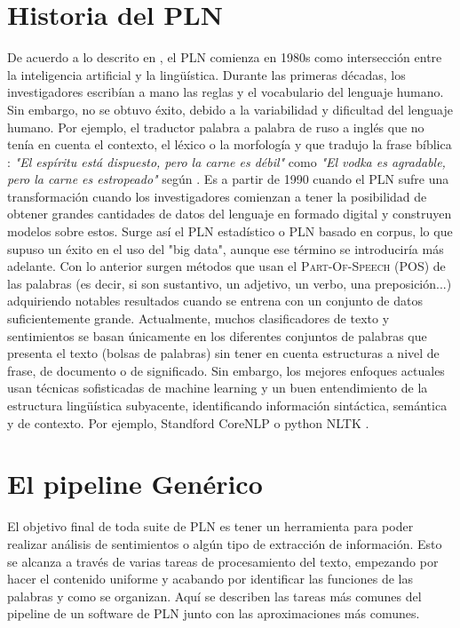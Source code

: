 \section{Historia del PLN}
De acuerdo a lo descrito en \citet{hirschberg2015advances}, el PLN comienza en 1980s como intersección entre la inteligencia artificial y la lingüística.  
Durante las primeras décadas, los investigadores escribían a mano las reglas y el vocabulario del lenguaje humano. Sin embargo, no se obtuvo éxito, debido a la variabilidad y dificultad del lenguaje humano. Por ejemplo, el traductor palabra a palabra de ruso a inglés que no tenía en cuenta el contexto, el léxico o la morfología y que tradujo la frase bíblica : \textsl{"El espíritu está dispuesto, pero la carne es débil"} como \textsl{"El vodka es agradable, pero la carne es
estropeado"} según \citet{nadkarni2011natural}. \newline
Es a partir de 1990 cuando el PLN sufre una transformación cuando los investigadores comienzan a tener la posibilidad de obtener grandes cantidades de datos del lenguaje en formado digital y construyen modelos sobre estos. Surge así el PLN estadístico o PLN basado en corpus, lo que supuso un éxito en el uso del "big data", aunque ese término se introduciría más adelante. Con lo anterior surgen métodos que usan el \textsc{Part-Of-Speech} (POS) de las palabras (es decir, si son sustantivo, un adjetivo, un verbo, una preposición...) adquiriendo notables resultados cuando se entrena con un conjunto de datos suficientemente grande. \newline
Actualmente, muchos clasificadores de texto y sentimientos se basan únicamente en los diferentes conjuntos de palabras que presenta el texto (bolsas de palabras) sin tener en cuenta estructuras a nivel de frase, de documento o de significado. Sin embargo, los mejores enfoques actuales usan técnicas sofisticadas de machine learning y un buen entendimiento de la estructura lingüística subyacente, identificando información sintáctica, semántica y de contexto. Por ejemplo, Standford CoreNLP \citet{manning2014stanford} o python NLTK \citet{bird2006nltk}. 

\section{El pipeline Genérico}
El objetivo final de toda suite de PLN es tener un herramienta para poder realizar análisis de sentimientos o algún tipo de extracción de información. Esto se alcanza a través de varias tareas de procesamiento del texto, empezando por hacer el contenido uniforme y acabando por identificar las funciones de las palabras y como se organizan. Aquí se describen las tareas más comunes del pipeline de un software de PLN junto con las aproximaciones más comunes. \newline
